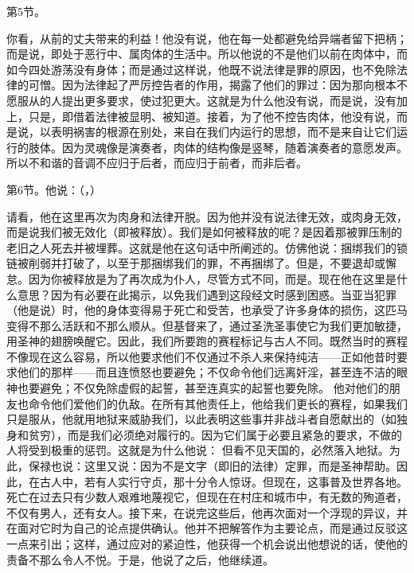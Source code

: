 第5节。\par

你看，从前的丈夫带来的利益！他没有说，他在每一处都避免给异端者留下把柄；而是说，即处于恶行中、属肉体的生活中。所以他说的不是他们以前在肉体中，而如今四处游荡没有身体；而是通过这样说，他既不说法律是罪的原因，也不免除法律的可憎。因为法律起了严厉控告者的作用，揭露了他们的罪过：因为那向根本不愿服从的人提出更多要求，使过犯更大。这就是为什么他没有说，而是说，没有加上，只是，即借着法律被显明、被知道。接着，为了他不控告肉体，他没有说，而是说，以表明祸害的根源在别处，来自在我们内运行的思想，而不是来自让它们运行的肢体。因为灵魂像是演奏者，肉体的结构像是竖琴，随着演奏者的意愿发声。所以不和谐的音调不应归于后者，而应归于前者，而非后者。\par

第6节。他说：（，）\par

请看，他在这里再次为肉身和法律开脱。因为他并没有说法律无效，或肉身无效，而是说我们被无效化（即被释放）。我们是如何被释放的呢？是因着那被罪压制的老旧之人死去并被埋葬。这就是他在这句话中所阐述的。仿佛他说：捆绑我们的锁链被削弱并打破了，以至于那捆绑我们的罪，不再捆绑了。但是，不要退却或懈怠。因为你被释放是为了再次成为仆人，尽管方式不同，而是。现在他在这里是什么意思？因为有必要在此揭示，以免我们遇到这段经文时感到困惑。当亚当犯罪（他是说）时，他的身体变得易于死亡和受苦，也承受了许多身体的损伤，这匹马变得不那么活跃和不那么顺从。但基督来了，通过圣洗圣事使它为我们更加敏捷，用圣神的翅膀唤醒它。因此，我们所要跑的赛程标记与古人不同。既然当时的赛程不像现在这么容易，所以他要求他们不仅通过不杀人来保持纯洁——正如他昔时要求他们的那样——而且连愤怒也要避免；不仅命令他们远离奸淫，甚至连不洁的眼神也要避免；不仅免除虚假的起誓，甚至连真实的起誓也要免除。 他对他们的朋友也命令他们爱他们的仇敌。在所有其他责任上，他给我们更长的赛程，如果我们只是服从，他就用地狱来威胁我们，以此表明这些事并非战斗者自愿献出的（如独身和贫穷），而是我们必须绝对履行的。因为它们属于必要且紧急的要求，不做的人将受到极重的惩罚。这就是为什么他说： 但看不见天国的，必然落入地狱。为此，保禄也说：这里又说：因为不是文字（即旧的法律）定罪，而是圣神帮助。因此，在古人中，若有人实行守贞，那十分令人惊讶。但现在，这事普及世界各地。死亡在过去只有少数人艰难地蔑视它，但现在在村庄和城市中，有无数的殉道者，不仅有男人，还有女人。接下来，在说完这些后，他再次面对一个浮现的异议，并在面对它时为自己的论点提供确认。他并不把解答作为主要论点，而是通过反驳这一点来引出；这样，通过应对的紧迫性，他获得一个机会说出他想说的话，使他的责备不那么令人不悦。于是，他说了之后，他继续道。\par

